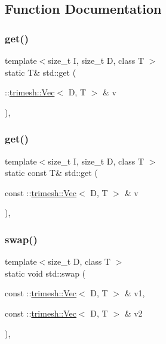 \subsection{Function Documentation}
\mbox{\label{namespacestd_a91947210c20127a94cc8b6d99d99cad5}} 
\subsubsection{\texorpdfstring{get()}{get()}\hspace{0.1cm}{\footnotesize\ttfamily [1/2]}}
{\footnotesize\ttfamily template$<$size\+\_\+t I, size\+\_\+t D, class T $>$ \\
static T\& std\+::get (\begin{DoxyParamCaption}\item[{\+::\hyperlink{classtrimesh_1_1Vec}{trimesh\+::\+Vec}$<$ D, T $>$ \&}]{v }\end{DoxyParamCaption})\hspace{0.3cm}{\ttfamily [inline]}, {\ttfamily [static]}}

\mbox{\label{namespacestd_a2da806b1329765712c9c301c10666ccd}} 
\subsubsection{\texorpdfstring{get()}{get()}\hspace{0.1cm}{\footnotesize\ttfamily [2/2]}}
{\footnotesize\ttfamily template$<$size\+\_\+t I, size\+\_\+t D, class T $>$ \\
static const T\& std\+::get (\begin{DoxyParamCaption}\item[{const \+::\hyperlink{classtrimesh_1_1Vec}{trimesh\+::\+Vec}$<$ D, T $>$ \&}]{v }\end{DoxyParamCaption})\hspace{0.3cm}{\ttfamily [inline]}, {\ttfamily [static]}}

\mbox{\label{namespacestd_a351b57d4089e8e63d265082e8458998e}} 
\subsubsection{\texorpdfstring{swap()}{swap()}}
{\footnotesize\ttfamily template$<$size\+\_\+t D, class T $>$ \\
static void std\+::swap (\begin{DoxyParamCaption}\item[{const \+::\hyperlink{classtrimesh_1_1Vec}{trimesh\+::\+Vec}$<$ D, T $>$ \&}]{v1,  }\item[{const \+::\hyperlink{classtrimesh_1_1Vec}{trimesh\+::\+Vec}$<$ D, T $>$ \&}]{v2 }\end{DoxyParamCaption})\hspace{0.3cm}{\ttfamily [inline]}, {\ttfamily [static]}}



